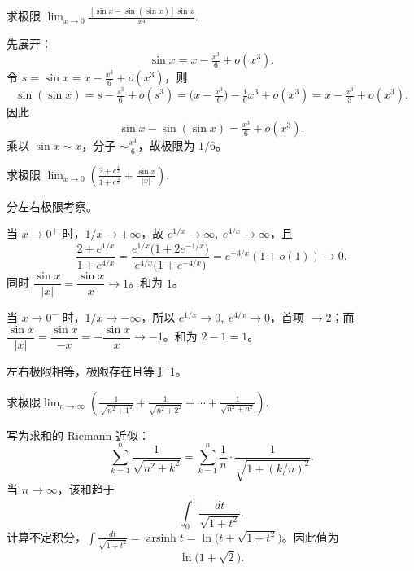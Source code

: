 \begin{question}{}{}

    求极限 $\lim_{x \to 0} \frac{[\sin x - \sin (\sin x)] \sin x}{x^4}$.
\end{question}
\begin{solution}
    先展开：
    \[
        \sin x = x-\tfrac{x^3}{6}+o(x^3).
    \]
    令 $s=\sin x=x-\tfrac{x^3}{6}+o(x^3)$，则
    \[
        \sin(\sin x)=s-\tfrac{s^3}{6}+o(s^3)=\Big(x-\tfrac{x^3}{6}\Big)-\tfrac{1}{6}x^3+o(x^3)=x-\tfrac{x^3}{3}+o(x^3).
    \]
    因此
    \[
        \sin x-\sin(\sin x)=\tfrac{x^3}{6}+o(x^3).
    \]
    乘以 $\sin x\sim x$，分子 $\sim \tfrac{x^4}{6}$，故极限为 $1/6$。
\end{solution}

\begin{question}{}{}

    求极限 $\lim_{x \to 0} \left(\frac{2 + e^{\frac{1}{x}}}{1 + e^{\frac{4}{x}}} + \frac{\sin x}{|x|}\right)$.
\end{question}
\begin{solution}
    分左右极限考察。

    当 $x\to0^+$ 时，$1/x\to+\infty$，故 $e^{1/x}\to\infty,\ e^{4/x}\to\infty$，且
    \[
        \frac{2+e^{1/x}}{1+e^{4/x}}=\frac{e^{1/x}\big(1+2e^{-1/x}\big)}{e^{4/x}\big(1+e^{-4/x}\big)}=e^{-3/x}(1+o(1))\to0.
    \]
    同时 $\dfrac{\sin x}{|x|}=\dfrac{\sin x}{x}\to1$。和为 $1$。

    当 $x\to0^-$ 时，$1/x\to-\infty$，所以 $e^{1/x}\to0,\ e^{4/x}\to0$，首项 $\to 2$；而 $\dfrac{\sin x}{|x|}=\dfrac{\sin x}{-x}=-\dfrac{\sin x}{x}\to -1$。和为 $2-1=1$。

    左右极限相等，极限存在且等于 $1$。
\end{solution}

\begin{question}{}{}

    求极限$\lim_{n\to\infty}\left(\frac{1}{\sqrt{n^2+1^2}}+\frac{1}{\sqrt{n^2+2^2}}+\cdots+\frac{1}{\sqrt{n^2+n^2}}\right)$.
\end{question}
\begin{solution}
    写为求和的 Riemann 近似：
    \[
        \sum_{k=1}^n \frac{1}{\sqrt{n^2+k^2}}=\sum_{k=1}^n \frac{1}{n}\cdot\frac{1}{\sqrt{1+(k/n)^2}}.
    \]
    当 $n\to\infty$，该和趋于
    \[
        \int_0^1 \frac{dt}{\sqrt{1+t^2}}.
    \]
    计算不定积分，$\int \frac{dt}{\sqrt{1+t^2}}=\operatorname{arsinh}t=\ln\big(t+\sqrt{1+t^2}\big)$。因此值为
    \[
        \ln\big(1+\sqrt2\big).
    \]
\end{solution}

